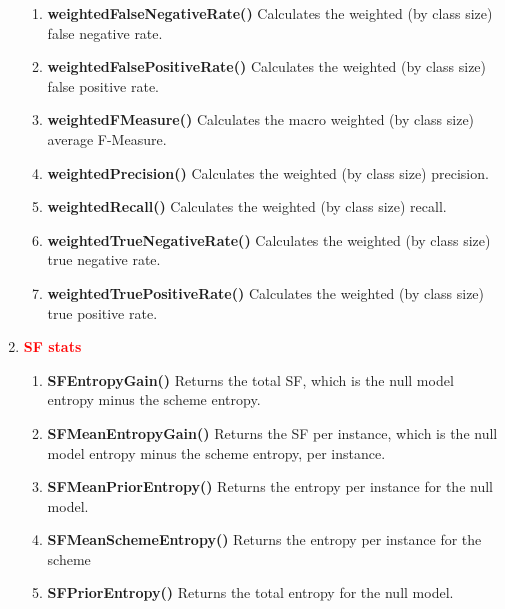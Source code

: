 \documentclass[a4paper,12pt, english]{article}
\begin{document}
\begin{enumerate}
\begin{enumerate}
\item \textbf{weightedFalseNegativeRate()}
          Calculates the weighted (by class size) false negative rate. 
          
\item \textbf{weightedFalsePositiveRate()}
          Calculates the weighted (by class size) false positive rate.                    

\item \textbf{weightedFMeasure()}
          Calculates the macro weighted (by class size) average F-Measure. 
                 
\item \textbf{weightedPrecision()}
          Calculates the weighted (by class size) precision. 
                    
\item \textbf{weightedRecall()}
          Calculates the weighted (by class size) recall.          

\item \textbf{weightedTrueNegativeRate()}
          Calculates the weighted (by class size) true negative rate. 

\item \textbf{weightedTruePositiveRate()}
          Calculates the weighted (by class size) true positive rate. 
\end{enumerate}
     

\item \textbf{\textcolor{red}{SF stats}}
\begin{enumerate}
              
\item \textbf{SFEntropyGain()}
          Returns the total SF, which is the null model entropy minus the scheme entropy.    
          

\item \textbf{SFMeanEntropyGain()}
          Returns the SF per instance, which is the null model entropy minus the scheme entropy, per instance.         
          

\item \textbf{SFMeanPriorEntropy()}
          Returns the entropy per instance for the null model.       
          
\item \textbf{SFMeanSchemeEntropy()}
          Returns the entropy per instance for the scheme        


\item \textbf{SFPriorEntropy()}
          Returns the total entropy for the null model.
          

\end{enumerate}
\end{enumerate}
\end{document}
